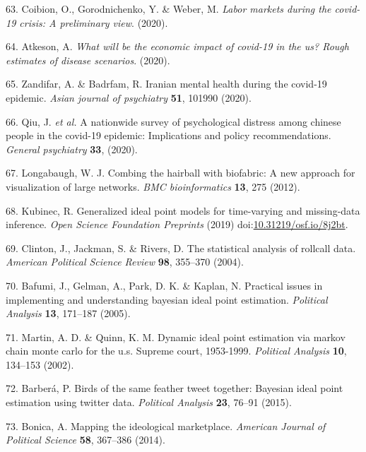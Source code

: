 \documentclass[]{article}
\begin{document}
\begin{cslreferences}
\leavevmode\hypertarget{ref-coibion2020labor}{}%
63. Coibion, O., Gorodnichenko, Y. \& Weber, M. \emph{Labor markets during the covid-19 crisis: A preliminary view}. (2020).

\leavevmode\hypertarget{ref-atkeson2020will}{}%
64. Atkeson, A. \emph{What will be the economic impact of covid-19 in the us? Rough estimates of disease scenarios}. (2020).

\leavevmode\hypertarget{ref-zandifar2020iranian}{}%
65. Zandifar, A. \& Badrfam, R. Iranian mental health during the covid-19 epidemic. \emph{Asian journal of psychiatry} \textbf{51}, 101990 (2020).

\leavevmode\hypertarget{ref-qiu2020nationwide}{}%
66. Qiu, J. \emph{et al.} A nationwide survey of psychological distress among chinese people in the covid-19 epidemic: Implications and policy recommendations. \emph{General psychiatry} \textbf{33}, (2020).

\leavevmode\hypertarget{ref-longabaugh2012}{}%
67. Longabaugh, W. J. Combing the hairball with biofabric: A new approach for visualization of large networks. \emph{BMC bioinformatics} \textbf{13}, 275 (2012).

\leavevmode\hypertarget{ref-kubinec2019ideal}{}%
68. Kubinec, R. Generalized ideal point models for time-varying and missing-data inference. \emph{Open Science Foundation Preprints} (2019) doi:\href{https://doi.org/10.31219/osf.io/8j2bt}{10.31219/osf.io/8j2bt}.

\leavevmode\hypertarget{ref-jackman2004}{}%
69. Clinton, J., Jackman, S. \& Rivers, D. The statistical analysis of rollcall data. \emph{American Political Science Review} \textbf{98}, 355--370 (2004).

\leavevmode\hypertarget{ref-gelman2005}{}%
70. Bafumi, J., Gelman, A., Park, D. K. \& Kaplan, N. Practical issues in implementing and understanding bayesian ideal point estimation. \emph{Political Analysis} \textbf{13}, 171--187 (2005).

\leavevmode\hypertarget{ref-quinn2002}{}%
71. Martin, A. D. \& Quinn, K. M. Dynamic ideal point estimation via markov chain monte carlo for the u.s. Supreme court, 1953-1999. \emph{Political Analysis} \textbf{10}, 134--153 (2002).

\leavevmode\hypertarget{ref-barbera2015}{}%
72. Barberá, P. Birds of the same feather tweet together: Bayesian ideal point estimation using twitter data. \emph{Political Analysis} \textbf{23}, 76--91 (2015).

\leavevmode\hypertarget{ref-bonica2014}{}%
73. Bonica, A. Mapping the ideological marketplace. \emph{American Journal of Political Science} \textbf{58}, 367--386 (2014).


\end{cslreferences}
\end{document}

